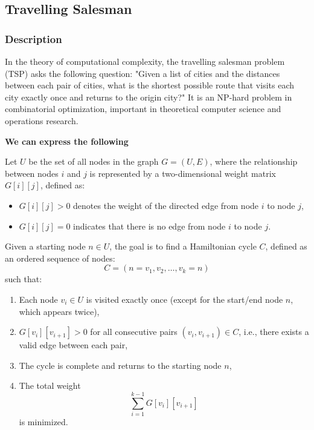 \subsection{Travelling Salesman}
\subsubsection{Description}

In the theory of computational complexity, the travelling salesman problem (TSP) asks the following question: "Given a list of cities and the distances between each pair of cities, what is the shortest possible route that visits each city exactly once and returns to the origin city?" It is an NP-hard problem in combinatorial optimization, important in theoretical computer science and operations research.

\textbf{We can express the following}

Let \( U \) be the set of all nodes in the graph \( G = (U, E) \), where the relationship between nodes \( i \) and \( j \) is represented by a two-dimensional weight matrix \( G[i][j] \), defined as:

\begin{itemize}
    \item \( G[i][j] > 0 \) denotes the weight of the directed edge from node \( i \) to node \( j \),
    \item \( G[i][j] = 0 \) indicates that there is no edge from node \( i \) to node \( j \).
\end{itemize}

Given a starting node \( n \in U \), the goal is to find a Hamiltonian cycle \( C \), defined as an ordered sequence of nodes:
\[
C = (n = v_1, v_2, \ldots, v_k = n)
\]
such that:

\begin{enumerate}[label=(\alph*)]
    \item Each node \( v_i \in U \) is visited exactly once (except for the start/end node \(  n \), which appears twice),
    \item \( G[v_i][v_{i+1}] > 0 \) for all consecutive pairs \( (v_i, v_{i+1}) \in C \), i.e., there exists a valid edge between each pair,
    \item The cycle is complete and returns to the starting node \( n \),
    \item The total weight
    \[
    \sum_{i=1}^{k-1} G[v_i][v_{i+1}]
    \]
    is minimized.
\end{enumerate}

